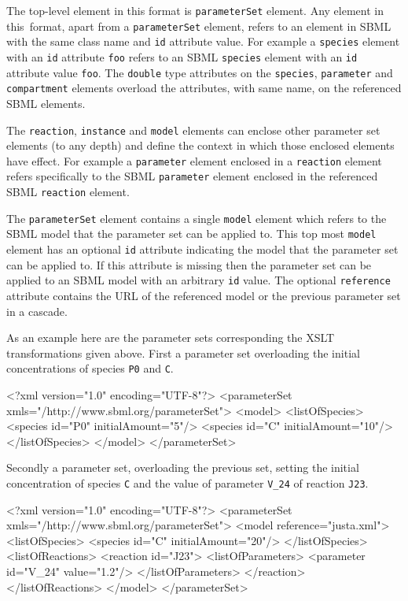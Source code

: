 \documentclass[10pt,twocolumntoc]{cekarticle}
\begin{document}
The top-level element in this format is \texttt{parameterSet} element.  Any element in this\
format, apart from a \texttt{parameterSet} element, refers to an element in SBML with the same
class name and \texttt{id} attribute value.  For example a \texttt{species} element with an
\texttt{id} attribute \texttt{foo} refers to an SBML \texttt{species} element with an
\texttt{id} attribute value \texttt{foo}.  The \texttt{double} type attributes on the
\texttt{species}, \texttt{parameter} and \texttt{compartment} elements
overload the attributes, with same name, on the referenced SBML elements.

The \texttt{reaction}, \texttt{instance} and \texttt{model} elements can enclose other
parameter set elements (to any depth) and define the context in which those enclosed
elements have effect. For example a \texttt{parameter} element enclosed in a
\texttt{reaction} element refers specifically to the SBML \texttt{parameter} element
enclosed in the referenced SBML \texttt{reaction} element.  

The \texttt{parameterSet} element contains a single \texttt{model} element which refers to
the SBML model that the parameter set can be applied to.  This top most \texttt{model}
element has an optional \texttt{id} attribute indicating the model that the parameter set can
be applied to. If this attribute is missing then the parameter set can be applied to an SBML
model with an arbitrary \texttt{id} value. The optional \texttt{reference} attribute contains
the URL of the referenced model or the previous parameter set in a cascade.

As an example here are the parameter sets corresponding the XSLT transformations given above.
First a parameter set overloading the initial concentrations of species \texttt{P0} and \texttt{C}.

\begin{example}
<?xml version="1.0" encoding="UTF-8"?>
<parameterSet xmls="/http://www.sbml.org/parameterSet">
  <model>
    <listOfSpecies>
      <species id="P0" initialAmount="5"/>
      <species id="C" initialAmount="10"/>
    </listOfSpecies>
  </model>
</parameterSet>
\end{example}

Secondly a parameter set, overloading the previous set, setting the initial concentration of species
\texttt{C} and the value of parameter \texttt{V\_24} of reaction \texttt{J23}.

\begin{example}
<?xml version="1.0" encoding="UTF-8"?>
<parameterSet xmls="/http://www.sbml.org/parameterSet">
  <model reference="justa.xml">
    <listOfSpecies>
      <species id="C" initialAmount="20"/>
    </listOfSpecies>
    <listOfReactions>
      <reaction id="J23">
        <listOfParameters>
          <parameter id="V_24" value="1.2"/>
        </listOfParameters>
      </reaction>
    </listOfReactions>
  </model>
</parameterSet>
\end{example}
\end{document}
